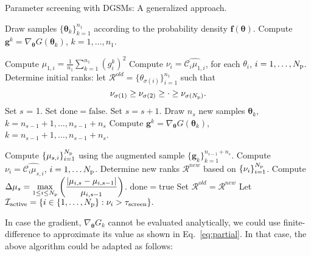 \clearpage
\begin{breakablealgorithm}
  \caption{Parameter screening with DGSMs: A generalized approach.}
  \begin{algorithmic}[1]
      \State Draw samples $\{ \bm{\theta}_k \}_{k = 1}^{n_1}$ 
       according to the probability density $\bm{f(\theta)}$.
      \State Compute $\bm{g}^k = \nabla_{\bm{\theta}}G(\bm\theta_k)$, 
             $k = 1, \ldots, n_1$. 

      \State Compute 
      $\mu_{1, i} = \frac{1}{n_1} \sum_{k = 1}^{n_1} (g^k_i)^2$
      \State Compute $\nu_i = \widehat{\mathcal{C}_i\mu_{1,i}}$, for each $\theta_i$, 
             $i = 1, \ldots, {N_\text{p}}$. 
      \State Determine initial ranks: 
            let $\mathcal{R}^{old} = \{ \theta_{\sigma(i)}\}_{i=1}^{n_1}$ such that 
\[
   \nu_{\sigma(1)} \geq \nu_{\sigma(2)} \geq \cdot \geq \nu_{\sigma({N_\text{p}})}. 
\]
      \State Set $s$ = 1.
      \State Set $\mathrm{done} = \mathrm{false}$.
        \State Set $s = s + 1$.
        \State Draw $n_s$ new samples 
                  $\bm{\theta}_k$, $k = n_{s-1} + 1, \ldots, n_{s-1} + n_s$
        \State Compute $\bm{g}^k = \nabla_{\bm{\theta}}G(\bm\theta_k)$,
             $k = n_{s-1}+1, \ldots, n_{s-1}+n_s$.

        \State Compute $\{ \mu_{s,i} \}_{i=1}^{N_\text{p}}$ using the augmented sample 
               $\{\bm{g}_k \}_{k = 1}^{n_{s-1}+n_s}$.
        \State Compute $\nu_i = \widehat{\mathcal{C}_i\mu_{s,i}}$, $i = 1, \ldots {N_\text{p}}$.
        \State Determine new ranks $\mathcal{R}^{new}$ based on $\{\nu_i\}_{i=1}^{N_\text{p}}$. 
        \State Compute $\displaystyle\Delta\mu_s = \max_{1\leq i \leq {N_\text{p}}}
               \left(\frac{|\mu_{i,s} - \mu_{i,s-1}|}{ \mu_{i,s-1}}\right)$.
         \State $\mathrm{done} = \mathrm{true}$
      \Else
          \State Set $\mathcal{R}^{old} = \mathcal{R}^{new}$
      \EndIf
    \EndWhile
    \State Let $\mathcal{I}_\text{active} = \{ i \in \{1, \ldots, {N_\text{p}}\} : \nu_i > \tau_\text{screen}\}.$
    
    \EndProcedure
  \end{algorithmic}
\end{breakablealgorithm}

\bigskip

In case the gradient, $\nabla_{\bm{\theta}}G_k$ cannot be evaluated analytically, we could use finite-difference
to approximate its value as shown in Eq.~\ref{eq:partial}. In that case, the above algorithm could be adapted as
follows:

